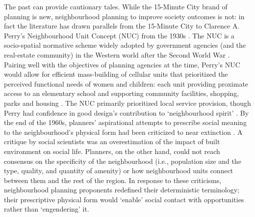 \documentclass[
  authoryear,
  preprint,
  3p]{elsarticle}
\begin{document}
The past can provide cautionary tales. While the 15-Minute City brand of
planning is new, neighbourhood planning to improve society outcomes is
not: in fact the literature has drawn parallels from the 15-Minute City
to Clarence A. Perry's Neighbourhood Unit Concept (NUC) from the 1930s
\citep{kissfazekasCircleParadigms15minute2022}. The NUC is a
socio-spatial normative scheme widely adopted by government agencies
(and the real-estate community) in the Western world after the Second
World War \citep{talenSocialSciencePlanned2017, solow1969concept}.
Pairing well with the objectives of planning agencies at the time,
Perry's NUC would allow for efficient mass-building of cellular units
that prioritized the perceived functional needs of women and children:
each unit providing proximate access to an elementary school and
supporting community facilities, shopping, parks and housing
\citep{talenSocialSciencePlanned2017, brodyNeighbourhoodUnitConcept2013}.
The NUC primarily prioritized local service provision, though Perry had
confidence in good design's contribution to `neighbourhood spirit'
\citep{hall2014cities}. By the end of the 1960s, planners' aspirational
attempts to prescribe social meaning to the neighbourhood's physical
form had been criticized to near extinction
\citep{talenSocialSciencePlanned2017}. A critique by social scientists
was an overestimation of the impact of built environment on social life.
Planners, on the other hand, could not reach consensus on the
specificity of the neighbourhood (i.e., population size and the type,
quality, and quantity of amenity) or how neighbourhood units connect
between them and the rest of the region. In response to these
criticisms, neighbourhood planning proponents redefined their
deterministic terminology; their prescriptive physical form would
`enable' social contact with opportunities rather than `engendering' it.
\end{document}
